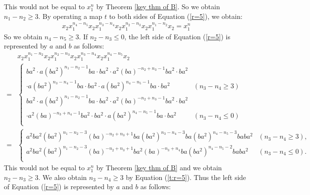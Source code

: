 \documentclass{amsart}
\theoremstyle{plain}
\theoremstyle{definition}
\begin{document}
This would not be equal to $x_1^n$ by Theorem \ref{key thm of B}. 
So we obtain $n_1-n_2\geq 3$. 
By operating a map $t$ to both sides of Equation (\ref{r=5}), we obtain: 
\begin{align}
\label{t:r=5}
x_2x_1^{n_4-n_5}x_2x_1^{n_3-n_4}x_2x_1^{n_2-n_3}x_2x_1^{n_1-n_2}x_2=x_1^n
\end{align}
So we obtain $n_4-n_5\geq 3$. 
If $n_2-n_3\leq 0$, the left side of Equation (\ref{r=5}) is represented by $a$ and $b$ as follows: 
{\allowdisplaybreaks
\begin{align*}
& x_2x_1^{n_1-n_2}x_2x_1^{n_2-n_3}x_2x_1^{n_3-n_4}x_2x_1^{n_4-n_5}x_2 \\
= & \begin{cases}
ba^2\cdot a(ba^2)^{n_1-n_2-1}ba\cdot ba^2\cdot a^2(ba)^{-n_2+n_3-1}ba^2\cdot ba^2 \\
\cdot a(ba^2)^{n_3-n_4-1}ba\cdot ba^2\cdot a(ba^2)^{n_4-n_5-1}ba\cdot ba^2 & (n_3-n_4\geq 3) \\
ba^2\cdot a(ba^2)^{n_1-n_2-1}ba\cdot ba^2\cdot a^2(ba)^{-n_2+n_3-1}ba^2\cdot ba^2 \\
\cdot a^2(ba)^{-n_3+n_4-1}ba^2\cdot ba^2\cdot a(ba^2)^{n_4-n_5-1}ba\cdot ba^2 & (n_3-n_4\leq 0) \\
\end{cases} \\
= & \begin{cases}
a^2ba^2(ba^2)^{n_1-n_2-3}(ba)^{-n_2+n_3+1}ba(ba^2)^{n_3-n_4-3}ba(ba^2)^{n_4-n_5-3}baba^2 & (n_3-n_4\geq 3), \\
a^2ba^2(ba^2)^{n_1-n_2-3}(ba)^{-n_2+n_3+1}ba^2(ba)^{-n_3+n_4}ba(ba^2)^{n_4-n_5-2}baba^2 & (n_3-n_4\leq 0). \\
\end{cases}
\end{align*}
}
This would not be equal to $x_1^n$ by Theorem \ref{key thm of B} and we obtain $n_2-n_3\geq 3$. 
We also obtain $n_3-n_4\geq 3$ by Equation (\ref{t:r=5}). 
Thus the left side of Equation (\ref{r=5}) is represented by $a$ and $b$ as follows: 
\end{document}
